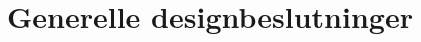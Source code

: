 \documentclass[Main]{subfiles}
\begin{document}
\section{Generelle designbeslutninger}
\end{document}
